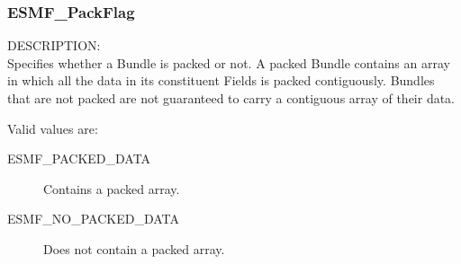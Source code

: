 
\subsubsection{ESMF\_PackFlag}

{\sf DESCRIPTION:\\}
Specifies whether a Bundle is packed or not.  A packed 
Bundle contains an array in which all the data in its 
constituent Fields is packed contiguously.  Bundles that
are not packed are not guaranteed to carry a contiguous 
array of their data.  

Valid values are:
\begin{description}
   \item [ESMF\_PACKED\_DATA] 
         Contains a packed array.
   \item [ESMF\_NO\_PACKED\_DATA]
         Does not contain a packed array.
\end{description}
